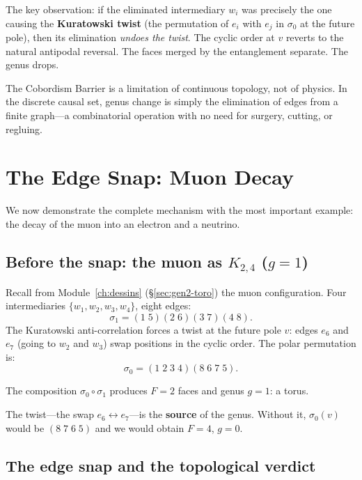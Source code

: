 The key observation: if the eliminated intermediary $w_i$ was precisely
the one causing the \textbf{Kuratowski twist} (the permutation of $e_i$
with $e_j$ in $\sigma_0$ at the future pole), then its elimination
\emph{undoes the twist}. The cyclic order at $v$ reverts to the
natural antipodal reversal. The faces merged by the entanglement
separate. The genus drops.

\begin{result}[title={Cobordism is an artifact of the continuum}]
The Cobordism Barrier is a limitation of continuous topology, not
of physics. In the discrete causal set, genus change is
simply the elimination of edges from a finite graph---a
combinatorial operation with no need for surgery, cutting, or regluing.
\end{result}

\section{The Edge Snap: Muon Decay}
\label{sec:chasquido}

We now demonstrate the complete mechanism with the most important example:
the decay of the muon into an electron and a neutrino.

\subsection{Before the snap: the muon as $K_{2,4}$ ($g = 1$)}

Recall from Module~\ref{ch:dessins} (\S\ref{sec:gen2-toro}) the
muon configuration. Four intermediaries $\{w_1, w_2, w_3, w_4\}$,
eight edges:
\[
  \sigma_1 = (1\;5)(2\;6)(3\;7)(4\;8).
\]
The Kuratowski anti-correlation forces a twist at the future pole $v$:
edges $e_6$ and $e_7$ (going to $w_2$ and $w_3$) swap
positions in the cyclic order. The polar permutation is:
\[
  \sigma_0 = (1\;2\;3\;4)(8\;6\;7\;5).
\]

The composition $\sigma_0 \circ \sigma_1$ produces $F = 2$ faces and genus
$g = 1$: a torus.

The twist---the swap $e_6 \leftrightarrow e_7$---is the
\textbf{source} of the genus. Without it, $\sigma_0(v)$ would be
$(8\;7\;6\;5)$ and we would obtain $F = 4$, $g = 0$.

\subsection{The edge snap and the topological verdict}
\label{subsec:edge-snap}


